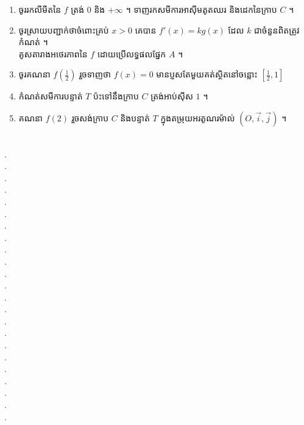 \documentclass{officialexam}
\begin{document}
\begin{enumerate}[I]
\begin{enumerate}[k]
			\item ចូររកលីមីតនៃ $f$ ត្រង់ $0$ និង $+\infty$ ។ ទាញរកសមីការអាស៊ីមតូតឈរ និងដេកនៃក្រាប $C$ ។
			\item ចូរស្រាយបញ្ជាក់ថាចំពោះគ្រប់ $x>0$ គេបាន $f'(x)=kg(x)$ ដែល $k$ ជាចំនួនពិតត្រូវកំណត់ ។​\\ គូសតារាងអថេរភាពនៃ $f$ ដោយប្រើលទ្ធផលផ្នែក $A$ ។
			\item ចូរគណនា $f\left(\frac{1}{2}\right)$ រួចទាញថា $f(x)=0$ មានប្ញសតែមួយគត់ស្ថិតនៅចន្លោះ $\left[\frac{1}{2},1\right]$
			\item កំណត់សមីការបន្ទាត់ $T$ ប៉ះទៅនឹងក្រាប $C$ ត្រង់អាប់ស៊ីស $1$ ។
			\item គណនា $f(2)$ រួចសង់ក្រាប $C$ និងបន្ទាត់ $T$ ក្នុងតម្រុយអរតូណរម៉ាល់ $(O,\vec{i}, \vec{j})$ ។
		\end{enumerate}
	\end{enumerate}
\\
{\color{white}.}\dotfill\\
{\color{white}.}\dotfill\\
{\color{white}.}\dotfill
\\
{\color{white}.}\dotfill\\
{\color{white}.}\dotfill\\
{\color{white}.}\dotfill
\\
{\color{white}.}\dotfill\\
{\color{white}.}\dotfill\\
{\color{white}.}\dotfill
\\
{\color{white}.}\dotfill\\
{\color{white}.}\dotfill\\
{\color{white}.}\dotfill
\\
{\color{white}.}\dotfill\\
{\color{white}.}\dotfill\\
{\color{white}.}\dotfill
\\
{\color{white}.}\dotfill\\
{\color{white}.}\dotfill\\
{\color{white}.}\dotfill
\\
{\color{white}.}\dotfill\\
{\color{white}.}\dotfill\\
{\color{white}.}\dotfill
\\
{\color{white}.}\dotfill\\
{\color{white}.}\dotfill
\newpage
{\maketitle}\\
\end{document}
